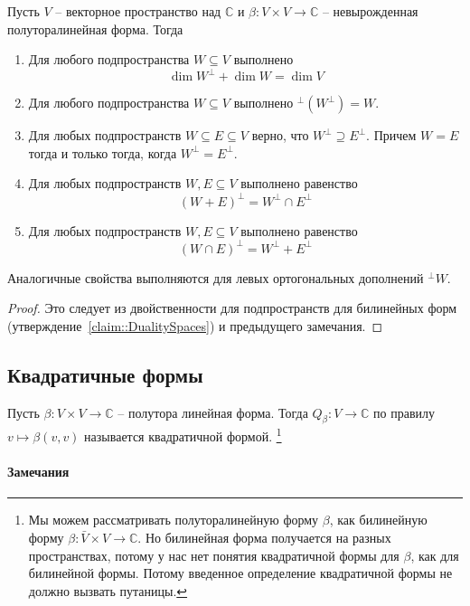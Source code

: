 \begin{claim}
Пусть $V$ -- векторное пространство над $\mathbb C$ и $\beta \colon V\times V\to \mathbb C$ -- невырожденная полуторалинейная форма.
Тогда
\begin{enumerate}
\item Для любого подпространства $W\subseteq V$ выполнено
\[
\dim W^\bot + \dim W = \dim V
\]

\item Для любого подпространства $W\subseteq V$ выполнено ${}^\bot(W^\bot) = W$.

\item Для любых подпространств $W\subseteq E\subseteq V$ верно, что $W^\bot \supseteq E^\bot$.
Причем $W = E$ тогда и только тогда, когда $W^\bot = E^\bot$.

\item Для любых подпространств $W, E\subseteq V$ выполнено равенство
\[
(W + E)^\bot = W^\bot \cap E^\bot
\]

\item Для любых подпространств $W, E\subseteq V$ выполнено равенство
\[
(W\cap E)^\bot = W^\bot + E^\bot
\]
\end{enumerate}
Аналогичные свойства выполняются для левых ортогональных дополнений ${}^\bot W$.
\end{claim}
\begin{proof}
Это следует из двойственности для подпространств для билинейных форм (утверждение~\ref{claim::DualitySpaces}) и предыдущего замечания.
\end{proof}

\subsection{Квадратичные формы}


\begin{definition}
Пусть $\beta\colon V\times V\to \mathbb C$ -- полутора линейная форма.
Тогда $Q_\beta\colon V\to \mathbb C$ по правилу $v\mapsto \beta(v,v)$ называется квадратичной формой.%
\footnote{Мы можем рассматривать полуторалинейную форму $\beta$, как билинейную форму $\beta\colon \bar V\times V\to \mathbb C$.
Но билинейная форма получается на разных пространствах, потому у нас нет понятия квадратичной формы для $\beta$, как для билинейной формы.
Потому введенное определение квадратичной формы не должно вызвать путаницы.}
\end{definition}

\paragraph{Замечания}


